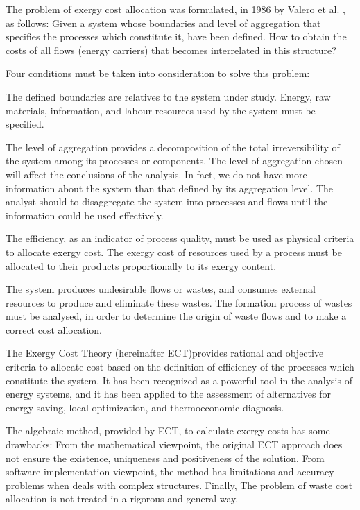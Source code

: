 \documentclass{ecos2018}
\begin{document}
The problem of exergy cost allocation was formulated, in 1986 by Valero et al. \cite{Valero1986}, as follows: Given a system whose boundaries and level of aggregation that specifies the processes which constitute it, have been defined. How to obtain the costs of all flows (energy carriers) that becomes interrelated in this structure?

Four conditions must be taken into consideration to solve this problem:
\begin{compactenum}[(i)]
	\item The defined boundaries are relatives to the system under study. Energy, raw materials, information, and labour resources used by the system must be specified.
	\item The level of aggregation provides a decomposition of the total irreversibility of the system among its processes or components. The level of aggregation chosen will affect the conclusions of the analysis. In fact, we do not have more information about the system than that defined by its aggregation level. The analyst should to disaggregate the system into processes and flows until the information could be used effectively. 
	\item The efficiency, as an indicator of process quality, must be used as physical criteria to allocate exergy cost. The exergy cost of resources used by a process must be allocated to their products proportionally to its exergy content. 
	\item The system produces undesirable flows or wastes, and consumes external resources to produce and eliminate these wastes. The formation process of wastes must be analysed, in order to determine the origin of waste flows and to make a correct cost allocation. 
\end{compactenum}

The Exergy Cost Theory \cite{ECT93} (hereinafter ECT)provides rational and objective criteria to allocate cost based on the definition of efficiency of the processes which constitute the system. It has been recognized as a powerful tool in the analysis of energy systems, and it has been applied to the assessment of alternatives for energy saving, local optimization, and thermoeconomic diagnosis.

The algebraic method, provided by ECT, to calculate exergy costs has some drawbacks: From the mathematical viewpoint, the original ECT approach does not ensure the existence, uniqueness and positiveness of the solution. From software implementation viewpoint, the method has limitations and accuracy problems when deals with complex structures. Finally, The problem of waste cost allocation is not treated in a rigorous and general way.
\end{document}

